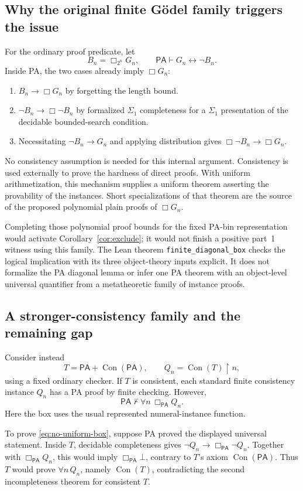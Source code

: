 \documentclass[11pt]{article}
\theoremstyle{definition}
\theoremstyle{remark}
\newcommand{\PA}{\mathsf{PA}}
\newcommand{\Con}{\operatorname{Con}}
\begin{document}
\subsection{Why the original finite G\"odel family triggers the issue}
For the ordinary proof predicate, let
\[
 B_n=\Box_{2^n}G_n,\qquad \PA\vdash G_n\leftrightarrow\neg B_n.
\]
Inside PA, the two cases already imply $\Box G_n$:
\begin{enumerate}
\item $B_n\to\Box G_n$ by forgetting the length bound.
\item $\neg B_n\to\Box\neg B_n$ by formalized $\Sigma_1$ completeness
      for a $\Sigma_1$ presentation of the decidable bounded-search condition.
\item Necessitating $\neg B_n\to G_n$ and applying distribution gives
      $\Box\neg B_n\to\Box G_n$.
\end{enumerate}
No consistency assumption is needed for this internal argument. Consistency
is used externally to prove the hardness of direct proofs. With uniform
arithmetization, this mechanism supplies a uniform theorem asserting the
provability of the instances. Short specializations of that theorem are the
source of the proposed polynomial plain proofs of $\Box G_n$.

Completing those polynomial proof bounds for the fixed PA-bin representation
would activate Corollary~\ref{cor:exclude}; it would not finish a positive
part~1 witness using this family. The Lean theorem
\texttt{finite\_diagonal\_box} checks the logical implication with its three
object-theory inputs explicit. It does not formalize the PA diagonal lemma
or infer one PA theorem with an object-level universal quantifier from a
metatheoretic family of instance proofs.

\subsection{A stronger-consistency family and the remaining gap}
Consider instead
\[
 T=\PA+\Con(\PA),\qquad Q_n=\Con(T)\restriction n,
\]
using a fixed ordinary checker. If $T$ is consistent, each standard finite
consistency instance $Q_n$ has a PA proof by finite checking. However,
\begin{equation}\label{eq:no-uniform-box}
 \PA\nvdash\forall n\,\Box_{\PA}Q_n.
\end{equation}
Here the box uses the usual represented numeral-instance function.

To prove \eqref{eq:no-uniform-box}, suppose PA proved the displayed universal
statement. Inside $T$, decidable completeness gives
$\neg Q_n\to\Box_{\PA}\neg Q_n$. Together with $\Box_{\PA}Q_n$, this
would imply $\Box_{\PA}\bot$, contrary to $T$'s axiom $\Con(\PA)$.
Thus $T$ would prove $\forall n\,Q_n$, namely $\Con(T)$, contradicting the
second incompleteness theorem for consistent $T$.
\end{document}
